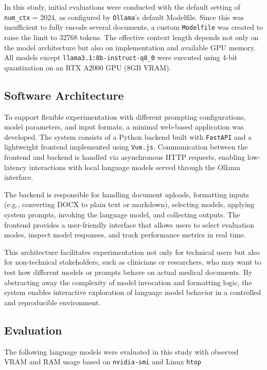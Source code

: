 In this study, initial evaluations were conducted with the default setting of
\texttt{num\_ctx} = 2024, as configured by \texttt{Ollama}'s default Modelfile.
Since this was insufficient to fully encode several documents, a custom
\texttt{Modelfile} was created to raise the limit to 32768 tokens. The
effective context length depends not only on the model architecture but also on
implementation and available GPU memory. All models except
\texttt{llama3.1:8b-instruct-q8\_0} were executed using 4-bit
quantization on an RTX A2000 GPU (8GB VRAM).

\clearpage
\subsection{Software Architecture}
To support flexible experimentation with different prompting configurations, model parameters, and input formats, a minimal web-based application was developed. The system consists of a Python backend built with \texttt{FastAPI} and a lightweight frontend implemented using \texttt{Vue.js}. Communication between the frontend and backend is handled via asynchronous HTTP requests, enabling low-latency interactions with local language models served through the Ollama interface.

The backend is responsible for handling document uploads, formatting inputs (e.g., converting DOCX to plain text or markdown), selecting models, applying system prompts, invoking the language model, and collecting outputs. The frontend provides a user-friendly interface that allows users to select evaluation modes, inspect model responses, and track performance metrics in real time.

This architecture facilitates experimentation not only for technical users but also for non-technical stakeholders, such as clinicians or researchers, who may want to test how different models or prompts behave on actual medical documents. By abstracting away the complexity of model invocation and formatting logic, the system enables interactive exploration of language model behavior in a controlled and reproducible environment.

\subsection{Evaluation}
The following language models were evaluated in this study with observed VRAM
and RAM usage based on \texttt{nvidia-smi} and Linux \texttt{htop}

